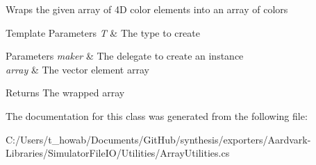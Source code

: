 Wraps the given array of 4D color elements into an array of colors 


\begin{DoxyTemplParams}{Template Parameters}
{\em T} & The type to create\\
\hline
\end{DoxyTemplParams}

\begin{DoxyParams}{Parameters}
{\em maker} & The delegate to create an instance\\
\hline
{\em array} & The vector element array\\
\hline
\end{DoxyParams}
\begin{DoxyReturn}{Returns}
The wrapped array
\end{DoxyReturn}


The documentation for this class was generated from the following file\+:\begin{DoxyCompactItemize}
\item 
C\+:/\+Users/t\+\_\+howab/\+Documents/\+Git\+Hub/synthesis/exporters/\+Aardvark-\/\+Libraries/\+Simulator\+File\+I\+O/\+Utilities/Array\+Utilities.\+cs\end{DoxyCompactItemize}
